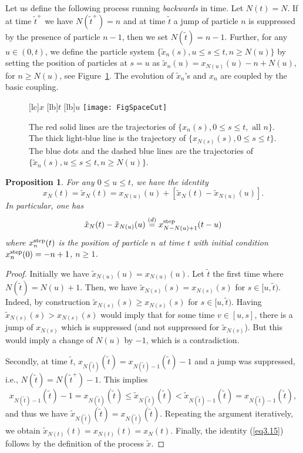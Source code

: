\documentclass[12pt,a4paper]{article}
\numberwithin{equation}{section}
\newtheorem{prop}{Proposition}[section]
\begin{document}
Let us define the following process running \emph{backwards} in time. Let $N(t)=N$. If at time $\tilde t^+$ we have $N(\tilde t^+)=n$ and at time $\tilde t$ a jump of particle $n$ is suppressed by the presence of particle $n-1$, then we set $N(\tilde t)=n-1$. Further, for any $u \in (0,t)$, we define the particle system $\{\tilde x_n(s),u\leq s\leq t, n\geq N(u)\}$ by setting the position of particles at $s=u$ as $\tilde x_n(u)=x_{N(u)}(u)-n+N(u)$, for $n\geq N(u)$, see Figure~\ref{FigSpaceCut}. The evolution of $\tilde x_n$'s and $x_n$ are coupled by the basic coupling.
\begin{figure}[t!]
\begin{center}
[lc]{$x$}
[lb]{$t$}
[lb]{$u$}
\texttt{[image: FigSpaceCut]}
\caption{The red solid lines are the trajectories of $\{x_n(s),0\leq s\leq t, \textrm{ all }n\}$. The thick light-blue line is the trajectory of $\{x_{N(s)}(s),0\leq s\leq t\}$. The blue dots and the dashed blue lines are the trajectories of $\{\tilde x_{n}(s), u\leq s\leq t,n\geq N(u)\}$.}
\label{FigSpaceCut}
\end{center}
\end{figure}

\begin{prop}\label{prop3.4}
For any $0\leq u\leq t$, we have the identity
\begin{equation}
x_N(t)=\tilde x_N(t) = x_{N(u)}(u)+\left[\tilde x_{N}(t)-\tilde x_{N(u)}(u)\right].
\end{equation}
In particular, one has
\begin{equation}\label{eq3.15}
\tilde x_{N}(t)-\tilde x_{N(u)}(u) \stackrel{(d)}{=} x^{\rm step}_{N-N(u)+1}(t-u)
\end{equation}
where $x^{\rm step}_n(t)$ is the position of particle $n$ at time $t$ with initial condition $x_n^{\rm step}(0)=-n+1$, $n\geq 1$.
\end{prop}
\begin{proof}
Initially we have $\tilde x_{N(u)}(u)=x_{N(u)}(u)$. Let $\tilde t$ the first time where $N(\tilde t)=N(u)+1$. Then, we have $\tilde x_{N(s)}(s)=x_{N(s)}(s)$ for $s\in [u,\tilde t)$. Indeed, by construction $\tilde x_{N(s)}(s)\geq x_{N(s)}(s)$ for $s\in[u,\tilde t)$. Having $\tilde x_{N(s)}(s)> x_{N(s)}(s)$ would imply that for some time $v\in[u,s]$, there is a jump of $x_{N(v)}$ which is suppressed (and not suppressed for $\tilde x_{N(v)}$). But this would imply a change of $N(u)$ by $-1$, which is a contradiction.

Secondly, at time $\tilde t$, $x_{N(\tilde t)}(\tilde t)=x_{N(\tilde t)-1}(\tilde t)-1$ and a jump was suppressed, i.e., $N(\tilde t)=N(\tilde t^+)-1$. This implies
\begin{equation}
x_{N(\tilde t)-1}(\tilde t)-1 = x_{N(\tilde t)}(\tilde t) \leq \tilde x_{N(\tilde t)}(\tilde t) <\tilde x_{N(\tilde t)-1}(\tilde t) = x_{N(\tilde t)-1}(\tilde t),
\end{equation}
and thus we have $\tilde x_{N(\tilde t)}(\tilde t) = x_{N(\tilde t)}(\tilde t)$. Repeating the argument iteratively, we obtain $\tilde x_{N(t)}(t)= x_{N(t)}(t)=x_N(t)$. Finally, the identity (\ref{eq3.15}) follows by the definition of the process $\tilde x$.
\end{proof}
\end{document}
